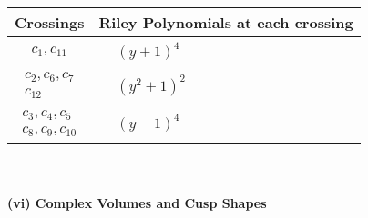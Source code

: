 \documentclass[1p]{elsarticle_modified}
\theoremstyle{definition}
\begin{document}
\begin{tabular}{m{50pt}|m{274pt}}
Crossings & \hspace{64pt}Riley Polynomials at each crossing \\
\hline $$\begin{aligned}c_{1},c_{11}\end{aligned}$$&$\begin{aligned}
&(y+1)^4
\end{aligned}$\\
\hline $$\begin{aligned}c_{2},c_{6},c_{7}\\c_{12}\end{aligned}$$&$\begin{aligned}
&(y^2+1)^2
\end{aligned}$\\
\hline $$\begin{aligned}c_{3},c_{4},c_{5}\\c_{8},c_{9},c_{10}\end{aligned}$$&$\begin{aligned}
&(y-1)^4
\end{aligned}$\\
\hline
\end{tabular}\\~\\
\newpage\flushleft \textbf{(vi) Complex Volumes and Cusp Shapes}
\end{document}
